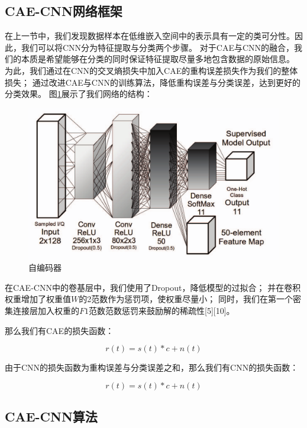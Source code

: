 \subsection{CAE-CNN网络框架}
在上一节中，我们发现数据样本在低维嵌入空间中的表示具有一定的类可分性。因此，我们可以将CNN分为特征提取与分类两个步骤。
对于CAE与CNN的融合，我们的本质是希望能够在分类的同时保证特征提取尽量多地包含数据的原始信息。
为此，我们通过在CNN的交叉熵损失中加入CAE的重构误差损失作为我们的整体损失；
通过改进CAE与CNN的训练算法，降低重构误差与分类误差，达到更好的分类效果。
图\ref{sec:fig_3_8}展示了我们网络的结构：
\begin{figure}[!h]
	\centering
	\includegraphics[scale=0.3]{figures/chapter_3/cae_cnn_frame}
	\caption{自编码器}	\label{sec:fig_3_8}
\end{figure}

在CAE-CNN中的卷基层中，我们使用了Dropout，降低模型的过拟合；
并在卷积权重增加了权重值$W$的2范数作为惩罚项，使权重尽量小；
同时，我们在第一个密集连接层加入权重的$F1$范数范数惩罚来鼓励解的稀疏性[5][10]。\par

那么我们有CAE的损失函数：\par
\begin{equation}\label{sec:eqt3_3}
r(t) = s(t)*c + n(t)
\end{equation}

由于CNN的损失函数为重构误差与分类误差之和，那么我们有CNN的损失函数：\par
\begin{equation}\label{sec:eqt3_4}
r(t) = s(t)*c + n(t)
\end{equation}


\subsection{CAE-CNN算法}

